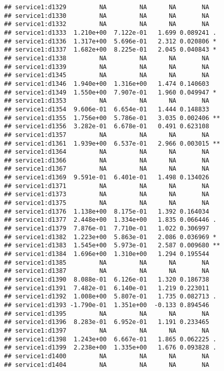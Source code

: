 \documentclass[
]{article}
\begin{document}
\begin{verbatim}
## service1:d1329         NA         NA      NA       NA    
## service1:d1330         NA         NA      NA       NA    
## service1:d1332         NA         NA      NA       NA    
## service1:d1333  1.210e+00  7.122e-01   1.699 0.089241 .  
## service1:d1336  1.317e+00  5.696e-01   2.312 0.020806 *  
## service1:d1337  1.682e+00  8.225e-01   2.045 0.040843 *  
## service1:d1338         NA         NA      NA       NA    
## service1:d1339         NA         NA      NA       NA    
## service1:d1345         NA         NA      NA       NA    
## service1:d1346  1.940e+00  1.316e+00   1.474 0.140603    
## service1:d1349  1.550e+00  7.907e-01   1.960 0.049947 *  
## service1:d1353         NA         NA      NA       NA    
## service1:d1354  9.606e-01  6.654e-01   1.444 0.148833    
## service1:d1355  1.756e+00  5.786e-01   3.035 0.002406 ** 
## service1:d1356  3.282e-01  6.678e-01   0.491 0.623108    
## service1:d1357         NA         NA      NA       NA    
## service1:d1361  1.939e+00  6.537e-01   2.966 0.003015 ** 
## service1:d1364         NA         NA      NA       NA    
## service1:d1366         NA         NA      NA       NA    
## service1:d1367         NA         NA      NA       NA    
## service1:d1369  9.591e-01  6.401e-01   1.498 0.134026    
## service1:d1371         NA         NA      NA       NA    
## service1:d1373         NA         NA      NA       NA    
## service1:d1375         NA         NA      NA       NA    
## service1:d1376  1.138e+00  8.175e-01   1.392 0.164034    
## service1:d1377  2.448e+00  1.334e+00   1.835 0.066446 .  
## service1:d1379  7.876e-01  7.710e-01   1.022 0.306997    
## service1:d1382  1.223e+00  5.863e-01   2.086 0.036969 *  
## service1:d1383  1.545e+00  5.973e-01   2.587 0.009680 ** 
## service1:d1384  1.696e+00  1.310e+00   1.294 0.195544    
## service1:d1385         NA         NA      NA       NA    
## service1:d1387         NA         NA      NA       NA    
## service1:d1390  8.088e-01  6.126e-01   1.320 0.186738    
## service1:d1391  7.482e-01  6.140e-01   1.219 0.223011    
## service1:d1392  1.008e+00  5.807e-01   1.735 0.082713 .  
## service1:d1393 -1.790e-01  1.351e+00  -0.133 0.894546    
## service1:d1395         NA         NA      NA       NA    
## service1:d1396  8.283e-01  6.952e-01   1.191 0.233465    
## service1:d1397         NA         NA      NA       NA    
## service1:d1398  1.243e+00  6.667e-01   1.865 0.062225 .  
## service1:d1399  2.238e+00  1.335e+00   1.676 0.093828 .  
## service1:d1400         NA         NA      NA       NA    
## service1:d1404         NA         NA      NA       NA    

\end{verbatim}
\end{document}
